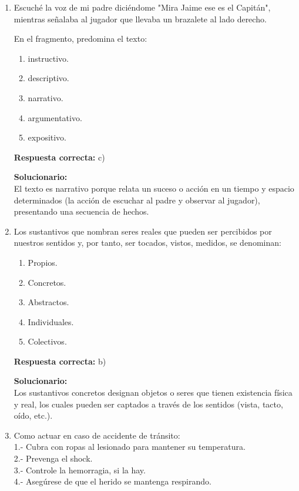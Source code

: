 \begin{enumerate}
	
\item Escuché la voz de mi padre diciéndome "Mira Jaime ese es el Capitán", mientras señalaba al jugador que llevaba un brazalete al lado derecho.

En el fragmento, predomina el texto:

\begin{enumerate}[label=\alph*)]
	\item instructivo.
	\item descriptivo.
	\item narrativo.
	\item argumentativo.
	\item expositivo.
\end{enumerate}

\textbf{Respuesta correcta:} c)

\vspace{2mm}
\textbf{Solucionario:}\\
El texto es narrativo porque relata un suceso o acción en un tiempo y espacio determinados (la acción de escuchar al padre y observar al jugador), presentando una secuencia de hechos.

\vspace{6mm}

\item Los sustantivos que nombran seres reales que pueden ser percibidos por nuestros sentidos y, por tanto, ser tocados, vistos, medidos, se denominan:

\begin{enumerate}[label=\alph*)]
	\item Propios.
	\item Concretos.
	\item Abstractos.
	\item Individuales.
	\item Colectivos.
\end{enumerate}

\textbf{Respuesta correcta:} b)

\vspace{2mm}
\textbf{Solucionario:}\\
Los sustantivos concretos designan objetos o seres que tienen existencia física y real, los cuales pueden ser captados a través de los sentidos (vista, tacto, oído, etc.).

\vspace{6mm}

\item Como actuar en caso de accidente de tránsito:\\
1.- Cubra con ropas al lesionado para mantener su temperatura.\\
2.- Prevenga el shock.\\
3.- Controle la hemorragia, si la hay.\\
4.- Asegúrese de que el herido se mantenga respirando.


\end{enumerate}
